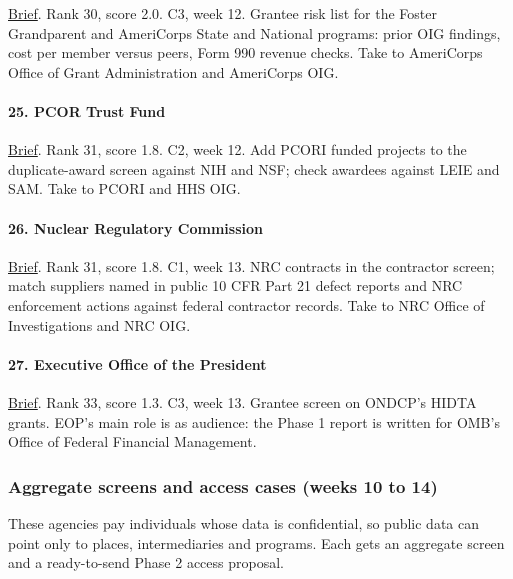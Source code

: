 \documentclass[letterpaper,11pt]{article}
\begin{document}
\href{agencies/cncs.pdf}{Brief}. Rank 30, score 2.0. C3, week 12.
Grantee risk list for the Foster Grandparent and AmeriCorps State and
National programs: prior OIG findings, cost per member versus peers,
Form 990 revenue checks. Take to AmeriCorps Office of Grant
Administration and AmeriCorps OIG.

\hypertarget{pcor-trust-fund}{%
\paragraph{25. PCOR Trust Fund}\label{pcor-trust-fund}}

\href{agencies/pcortf.pdf}{Brief}. Rank 31, score 1.8. C2, week 12. Add
PCORI funded projects to the duplicate-award screen against NIH and NSF;
check awardees against LEIE and SAM. Take to PCORI and HHS OIG.

\hypertarget{nuclear-regulatory-commission}{%
\paragraph{26. Nuclear Regulatory
Commission}\label{nuclear-regulatory-commission}}

\href{agencies/nrc.pdf}{Brief}. Rank 31, score 1.8. C1, week 13. NRC
contracts in the contractor screen; match suppliers named in public 10
CFR Part 21 defect reports and NRC enforcement actions against federal
contractor records. Take to NRC Office of Investigations and NRC OIG.

\hypertarget{executive-office-of-the-president}{%
\paragraph{27. Executive Office of the
President}\label{executive-office-of-the-president}}

\href{agencies/eop.pdf}{Brief}. Rank 33, score 1.3. C3, week 13. Grantee
screen on ONDCP's HIDTA grants. EOP's main role is as audience: the
Phase 1 report is written for OMB's Office of Federal Financial
Management.

\hypertarget{aggregate-screens-and-access-cases-weeks-10-to-14}{%
\subsubsection{Aggregate screens and access cases (weeks 10 to
14)}\label{aggregate-screens-and-access-cases-weeks-10-to-14}}

These agencies pay individuals whose data is confidential, so public
data can point only to places, intermediaries and programs. Each gets an
aggregate screen and a ready-to-send Phase 2 access proposal.
\end{document}
